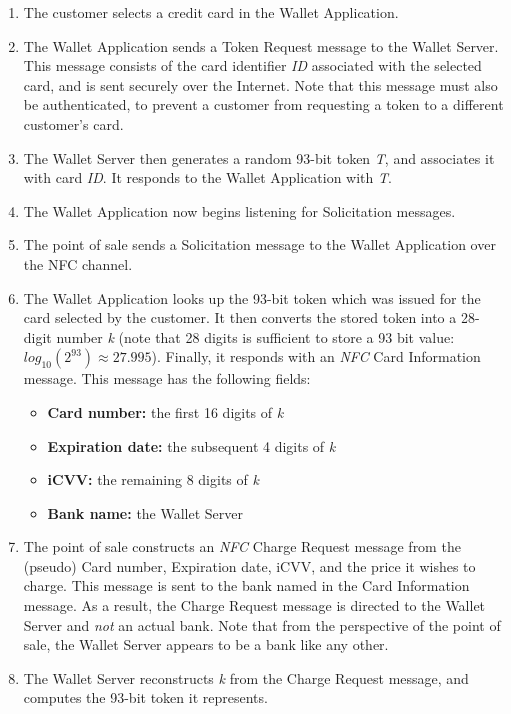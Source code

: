 \begin{enumerate}
\item The customer selects a credit card in the Wallet Application.
\item The Wallet Application sends a Token Request message to the Wallet Server.
    This message consists of the card identifier \emph{ID} associated with the selected card, and is sent securely over the Internet.
    Note that this message must also be authenticated, to prevent a customer from requesting a token to a different customer's card.
\item The Wallet Server then generates a random 93-bit token \emph{T}, and associates it with card \emph{ID}.
    It responds to the Wallet Application with \emph{T}.
\item The Wallet Application now begins listening for Solicitation messages.
\item The point of sale sends a Solicitation message to the Wallet Application over the NFC channel.
\item The Wallet Application looks up the 93-bit token which was issued for the card selected by the customer.
    It then converts the stored token into a 28-digit number \emph{k}
    (note that 28 digits is sufficient to store a 93 bit value: $log_{10}(2^{93}) \approx 27.995$).
    Finally, it responds with an \emph{NFC} Card Information message.
    This message has the following fields:
    \begin{itemize}
    \item \textbf{Card number:} the first 16 digits of \emph{k}
    \item \textbf{Expiration date:} the subsequent 4 digits of \emph{k}
    \item \textbf{iCVV:} the remaining 8 digits of \emph{k}
    \item \textbf{Bank name:} the Wallet Server
   	\end{itemize}
\item The point of sale constructs an \emph{NFC} Charge Request message from the (pseudo) Card number, Expiration date, iCVV, and the price it wishes to charge.
    This message is sent to the bank named in the Card Information message.
    As a result, the Charge Request message is directed to the Wallet Server and \emph{not} an actual bank.
    Note that from the perspective of the point of sale, the Wallet Server appears to be a bank like any other.
\item The Wallet Server reconstructs \emph{k} from the Charge Request message, and computes the 93-bit token it represents.

\end{enumerate}
